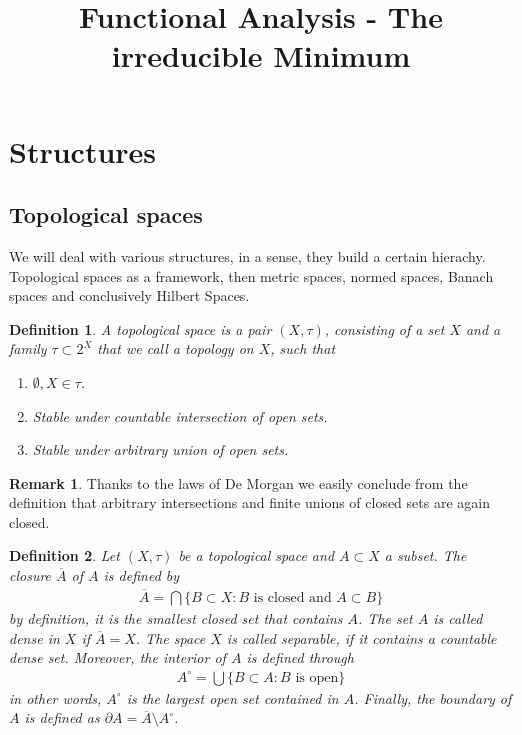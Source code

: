 \documentclass[11pt,a4paper]{article}
\title{Functional Analysis - The irreducible Minimum}
\date{}
\newtheorem{defn}{Definition}[section]
\theoremstyle{definition}
\newtheorem{rem}{Remark}[section]
\begin{document}
\maketitle
\tableofcontents
\section{Structures}
\subsection{Topological spaces}
We will deal with various structures, in a sense, they build a certain hierachy. Topological spaces as a framework, then metric spaces, normed spaces, Banach spaces and conclusively Hilbert Spaces. 

\begin{defn} A topological space is a pair $(X, \tau)$, consisting of a set $X$ and a family $\tau \subset 2^X$ that we call a topology on $X$, such that 
\begin{enumerate}
\item $\emptyset, X \in \tau$.
\item Stable under countable intersection of open sets.
\item Stable under arbitrary union of open sets.
\end{enumerate}

\end{defn}
\begin{rem} Thanks to the laws of De Morgan we easily conclude from the definition that arbitrary intersections and finite unions of closed sets are again closed. 
\end{rem}
\begin{defn}
Let $(X, \tau)$ be a topological space and $A \subset X$ a subset. The closure $\overline{A}$ of $A$ is defined by 
\begin{align*}
\overline{A}= \bigcap \lbrace B \subset X : B \text{ is closed and } A \subset B \rbrace
\end{align*}
by definition, it is the smallest closed set that contains $A$. The set $A$ is called dense in $X$ if $\overline{A}=X$. The space $X$ is called separable, if it contains a countable dense set. Moreover, the interior of $A$ is defined through
\begin{align*}
A^\circ = \bigcup \lbrace B \subset A : B \text{ is open} \rbrace
\end{align*}
in other words, $A^\circ$ is the largest open set contained in $A$. Finally, the boundary of $A$ is defined as $\partial A = \overline{A} \setminus A^\circ$. 
\end{defn}
\end{document}
